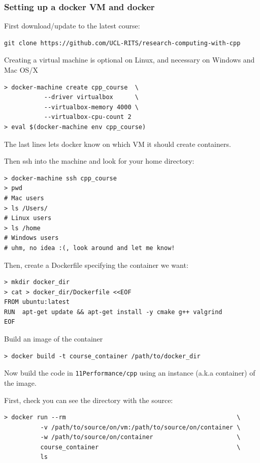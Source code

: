 \subsubsection{Setting up a docker VM and
docker}\label{setting-up-a-docker-vm-and-docker}

First download/update to the latest course:

\begin{verbatim}
git clone https://github.com/UCL-RITS/research-computing-with-cpp
\end{verbatim}

Creating a virtual machine is optional on Linux, and necessary on
Windows and Mac OS/X

\begin{verbatim}
> docker-machine create cpp_course  \
           --driver virtualbox      \
           --virtualbox-memory 4000 \
           --virtualbox-cpu-count 2
> eval $(docker-machine env cpp_course)
\end{verbatim}

The last lines lets docker know on which VM it should create containers.

Then ssh into the machine and look for your home directory:

\begin{verbatim}
> docker-machine ssh cpp_course
> pwd
# Mac users
> ls /Users/
# Linux users
> ls /home
# Windows users
# uhm, no idea :(, look around and let me know!
\end{verbatim}

Then, create a Dockerfile specifying the container we want:

\begin{verbatim}
> mkdir docker_dir
> cat > docker_dir/Dockerfile <<EOF
FROM ubuntu:latest
RUN  apt-get update && apt-get install -y cmake g++ valgrind
EOF
\end{verbatim}

Build an image of the container

\begin{verbatim}
> docker build -t course_container /path/to/docker_dir
\end{verbatim}

Now build the code in \texttt{11Performance/cpp} using an instance
(a.k.a container) of the image.

First, check you can see the directory with the source:

\begin{verbatim}
> docker run --rm                                               \
          -v /path/to/source/on/vm:/path/to/source/on/container \
          -w /path/to/source/on/container                       \
          course_container                                      \
          ls
\end{verbatim}

